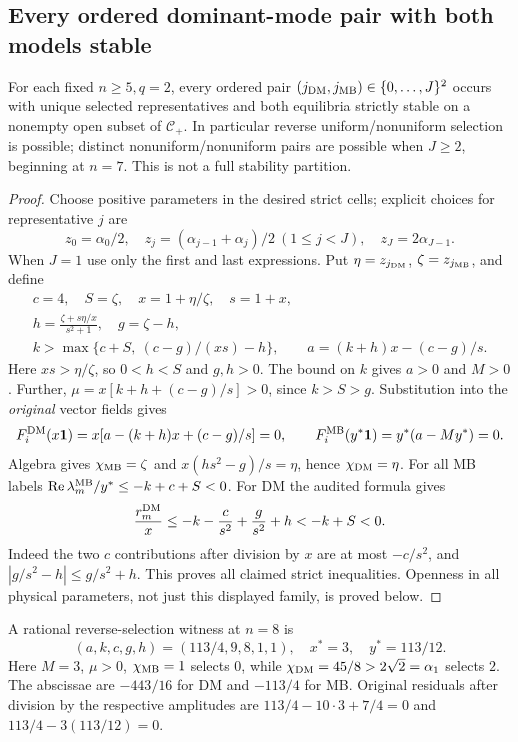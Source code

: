 \subsection{Every ordered dominant-mode pair with both models stable}
\begin{theorem}
\label{thm:P08-pair-realization}
For each fixed $n\ge5,q=2$, every ordered pair
$(j_{\mathrm{DM}},j_{\mathrm{MB}})\in\{0,\ldots,J\}^2$ occurs with unique selected
representatives and both equilibria strictly stable on a nonempty open
subset of $\mathcal C_+$. In particular reverse uniform/nonuniform
selection is possible; distinct nonuniform/nonuniform pairs are possible
when $J\ge2$, beginning at $n=7$. This is not a full stability partition.
\end{theorem}
\begin{proof}
Choose positive parameters in the desired strict cells; explicit choices
for representative $j$ are
\[
 z_0=\alpha_0/2,\quad
 z_j=(\alpha_{j-1}+\alpha_j)/2\ (1\le j<J),\quad
 z_J=2\alpha_{J-1}.
\]
When $J=1$ use only the first and last expressions. Put
$\eta=z_{j_{\mathrm{DM}}}$, $\zeta=z_{j_{\mathrm{MB}}}$, and define
\begin{equation}
\begin{gathered}
 c=4,\quad S=\zeta,\quad x=1+\eta/\zeta,\quad s=1+x,\\
 h=\frac{\zeta+s\eta/x}{s^2+1},\quad g=\zeta-h,\\
 k>\max\{c+S,\ (c-g)/(xs)-h\},\qquad
 a=(k+h)x-(c-g)/s.
\end{gathered}\label{eq:P08-pair-construction}
\end{equation}
Here $xs>\eta/\zeta$, so $0<h<S$ and $g,h>0$. The bound on $k$
gives $a>0$ and $M>0$. Further,
$\mu=x[k+h+(c-g)/s]>0$, since $k>S>g$. Substitution into the
\emph{original} vector fields gives
\begin{equation}
 F_i^{\mathrm{DM}}(x\mathbf{1})=x[a-(k+h)x+(c-g)/s]=0,\qquad
 F_i^{\mathrm{MB}}(y^*\mathbf{1})=y^*(a-My^*)=0.
 \label{eq:P08-residual-general}
\end{equation}
Algebra gives $\chi_{\mathrm{MB}}=\zeta$ and
$x(hs^2-g)/s=\eta$, hence $\chi_{\mathrm{DM}}=\eta$.
For all MB labels $\operatorname{Re}\lambda_m^{\mathrm{MB}}/y^*\le-k+c+S<0$.
For DM the audited formula gives
\begin{equation}
 \frac{r_m^{\mathrm{DM}}}x
 \le-k-\frac{c}{s^2}+\frac{g}{s^2}+h<-k+S<0.
 \label{eq:P08-DM-bound}
\end{equation}
Indeed the two $c$ contributions after division by $x$ are at most
$-c/s^2$, and $|g/s^2-h|\le g/s^2+h$. This proves all claimed
strict inequalities. Openness in all physical parameters, not just this
displayed family, is proved below.
\end{proof}
A rational reverse-selection witness at $n=8$ is
\begin{equation}
 (a,k,c,g,h)=(113/4,9,8,1,1),\quad x^*=3,\quad y^*=113/12.
 \label{eq:P08-reverse-selection-example}
\end{equation}
Here $M=3$, $\mu>0$, $\chi_{\mathrm{MB}}=1$ selects $0$, while
$\chi_{\mathrm{DM}}=45/8>2\sqrt2=\alpha_1$ selects $2$.
The abscissae are $-443/16$ for DM and $-113/4$ for MB.
Original residuals after division by the respective amplitudes are
$113/4-10\cdot3+7/4=0$ and $113/4-3(113/12)=0$.

